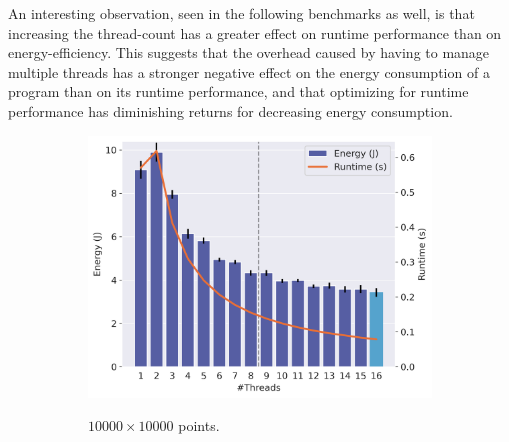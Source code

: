 An interesting observation, seen in the following benchmarks as well, is that increasing the
thread-count has a greater effect on runtime performance than on energy-efficiency. This suggests
that the overhead caused by having to manage multiple threads has a stronger negative effect on the
energy consumption of a program than on its runtime performance, and that optimizing for runtime
performance has diminishing returns for decreasing energy consumption.

\begin{figure}[!ht]
    \centering
    \begin{subfigure}{0.33\linewidth}
        \includegraphics[width=\linewidth,alt={
            Chart showing energy consumption and runtime across different numbers of threads. The
            x-axis represents the number of threads from 1 to 16. The left y-axis shows bars
            indicating energy consumption in joules. The right y-axis shows an orange line
            indicating the runtime in seconds. Energy consumption peaks at two threads, and steadily
            decreases until roughly eight threads, after which it plateaus and reaches a minimum at
            16 threads. Runtime peaks at two threads, and gradually decreases until it reaches the
            minimum at 16 threads.
        }]{images/stencil_10000.png}
        \caption{$10000 \times 10000$ points.}
        \label{fig:stencil1}
    \end{subfigure}%
    \begin{subfigure}{0.33\linewidth}

\end{subfigure}
\end{figure}

